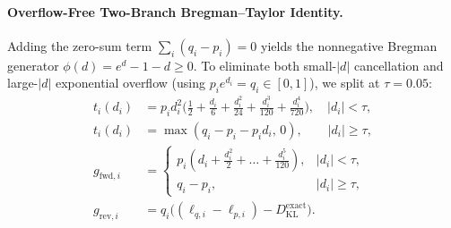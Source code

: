 \documentclass[10pt]{article}
\newcommand{\KL}{D_{\mathrm{KL}}}
\begin{document}
\paragraph{Overflow-Free Two-Branch Bregman--Taylor Identity.} Adding the zero-sum term $\sum_i (q_i - p_i) = 0$ yields the nonnegative Bregman generator $\phi(d) = e^d - 1 - d \ge 0$. To eliminate both small-$|d|$ cancellation and large-$|d|$ exponential overflow (using $p_i e^{d_i} = q_i \in [0,1]$), we split at $\tau = 0.05$:
\begin{align}
  t_i(d_i) &= p_i d_i^2 \big(\tfrac{1}{2} + \tfrac{d_i}{6} + \tfrac{d_i^2}{24} + \tfrac{d_i^3}{120} + \tfrac{d_i^4}{720}\big), \quad |d_i| < \tau, \label{eq:taylor} \\
  t_i(d_i) &= \max(q_i - p_i - p_i d_i,\, 0), \qquad |d_i| \ge \tau, \label{eq:exact} \\
  g_{\mathrm{fwd},i} &= \begin{cases} p_i (d_i + \tfrac{d_i^2}{2} + \dots + \tfrac{d_i^5}{120}), & |d_i| < \tau, \\ q_i - p_i, & |d_i| \ge \tau, \end{cases} \nonumber \\
  g_{\mathrm{rev},i} &= q_i\big((\ell_{q,i} - \ell_{p,i}) - \KL^{\mathrm{exact}}\big). \label{eq:grad}
\end{align}
\end{document}

